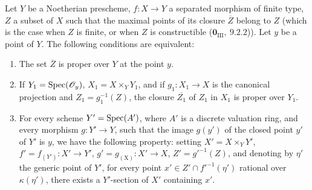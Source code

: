 \begin{corollary}[15.7.4]
\label{IV.15.7.4}
Let $Y$ be a Noetherian prescheme, $f:X\to Y$ a separated morphism of finite type, $Z$ a subset of $X$ such that the maximal points of its closure $\overline{Z}$ belong to $Z$ (which is the case when $Z$ is finite, or when $Z$ is constructible ($\mathbf{0}_{\mathrm{III}},~9.2.2$)).
Let $y$ be a point of $Y$.
The following conditions are equivalent:
\begin{enumerate}[label=\emph{\alph*)}]
  \item The set $\overline{Z}$ is proper over $Y$ at the point $y$.
  \item If $Y_1=\operatorname{Spec}(\mathscr{O}_y)$, $X_1=X\times_Y Y_1$, and if $g_1:X_1\to X$ is the canonical projection and $Z_1=g_1^{-1}(Z)$, the closure $\overline{Z_1}$ of $Z_1$ in $X_1$ is proper over $Y_1$.
  \item For every scheme $Y'=\operatorname{Spec}(A')$, where $A'$ is a discrete valuation ring, and every morphism $g:Y'\to Y$, such that the image $g(y')$ of the closed point $y'$ of $Y'$ is $y$, we have the following property: setting $X'=X\times_Y Y'$, $f'=f_{(Y')}:X'\to Y'$, $g'=g_{(\mathrm{X})}:X'\to X$, $Z'=g'^{-1}(Z)$, and denoting by $\eta'$
the generic point of $Y'$, for every point $x'\in Z'\cap f'^{-1}(\eta')$ rational over $\kappa(\eta')$, there exists a $Y'$-section of $X'$ containing $x'$.
\end{enumerate}
\end{corollary}

